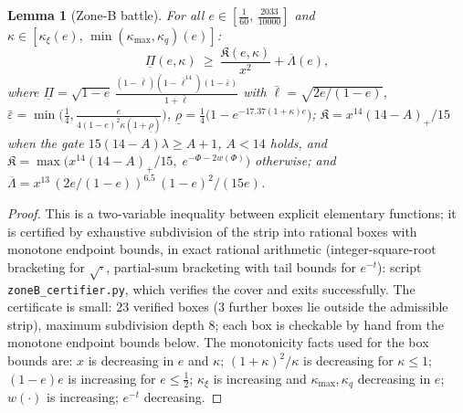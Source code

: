 \documentclass[11pt]{article}
\newtheorem{lemma}[theorem]{Lemma}
\newcommand{\eps}{\varepsilon}
\begin{document}
\begin{lemma}[Zone-B battle]\label{lem:zoneB-battle}
For all $e\in[\tfrac1{60},\,\tfrac{2033}{10000}]$ and
$\kappa\in[\kappa_\xi(e),\,\min(\kappa_{\max},\kappa_q)(e)]$:
\begin{equation}\label{eq:B-battle}
        \underline\Pi(e,\kappa)\ \ge\
        \frac{\mathfrak K(e,\kappa)}{x^2}+\overline\Lambda(e),
\end{equation}
where
$\underline\Pi=\sqrt{1-e}\,\frac{(1-\bar\ell)(1-\bar\ell^{14})
(1-\bar\eps)}{1+\bar\ell}$ with $\bar\ell=\sqrt{2e/(1-e)}$,
$\bar\eps=\min\bigl(\tfrac14,\frac{e}{4(1-e)^2\kappa(1+\underline\rho)}\bigr)$,
$\underline\rho=\tfrac14\bigl(1-e^{-17.37(1+\kappa)e}\bigr)$;
$\mathfrak K=x^{14}(14-A)_+/15$ when the gate
$15(14-A)\lambda\ge A+1$, $A<14$ holds, and
$\mathfrak K=\max\bigl(x^{14}(14-A)_+/15,\;e^{-\Phi-2w(\Phi)}\bigr)$
otherwise; and
$\overline\Lambda=x^{13}\,(2e/(1-e))^{6.5}\,(1-e)^2/(15e)$.
\end{lemma}

\begin{proof}
This is a two-variable inequality between explicit elementary functions; it
is certified by exhaustive subdivision of the strip into rational boxes with
monotone endpoint bounds, in exact rational arithmetic (integer-square-root
bracketing for $\sqrt{\cdot}$, partial-sum bracketing with tail bounds for
$e^{-t}$): script \texttt{zoneB\_certifier.py}, which verifies the cover and
exits successfully.  The certificate is small: $23$ verified boxes ($3$
further boxes lie outside the admissible strip), maximum subdivision
depth $8$; each box is checkable by hand from the monotone endpoint bounds
below.
The monotonicity facts used for the box bounds are: $x$ is decreasing in $e$
and $\kappa$; $(1+\kappa)^2/\kappa$ is decreasing for $\kappa\le1$; $(1-e)e$
is increasing for $e\le\tfrac12$; $\kappa_\xi$ is increasing and
$\kappa_{\max},\kappa_q$ decreasing in $e$; $w(\cdot)$ is increasing;
$e^{-t}$ decreasing.
\end{proof}
\end{document}
